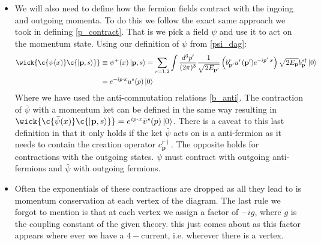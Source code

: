 \documentclass[11pt]{article}
\numberwithin{equation}{section}
\begin{document}
\begin{itemize}
   \item We will also need to define how the fermion fields contract with the ingoing and outgoing momenta. To do this we follow the exact same approach we took in defining \ref{p_contract}. That is we pick a field $\psi$ and use it to act on the momentum state. Using our definition of $\psi$ from \ref{psi_dag}:
   \begin{align}
   \label{p_contract_psi}
      \wick{\c{\psi(x)}\c{\ket{\textbf{p},s}}} &\equiv \psi^+(x)\ket{\textbf{p},s} = \sum_{r=1,2}\int \frac{d^3p'}{(2\pi)^3}\frac{1}{\sqrt{2E_{\textbf{p}'}}}\left(b^{r}_{\textbf{p}'}u^r(\textbf{p}')e^{-ip'\cdot x}\right) \sqrt{2E_{\textbf{p}}}b^{s \dagger}_{\textbf{p}}\ket{0} \nonumber \\
      & = e^{-ip\cdot x}u^{s}(p)\ket{0}
    \end{align} 
    Where we have used the anti-commutation relations \ref{b_anti}. The contraction of $\bar{\psi}$ with a momentum ket can be defined in the same way resulting in $\wick{\c{\bar{\psi}(x)}\c{\ket{\textbf{p},s}}} = e^{ip\cdot x}\bar{v}^{s}(p)\ket{0}$. There is a caveat to this last definition in that it only holds if the ket $\bar{\psi}$ acts on is a anti-fermion as it needs to contain the creation operator $c^{r \dagger}_{\textbf{p}}$. The opposite holds for contractions with the outgoing states. $\psi$ must contract with outgoing anti-fermions and $\bar{\psi}$ with outgoing fermions.

    \item Often the exponentials of these contractions are dropped as all they lead to is momentum conservation at each vertex of the diagram. The last rule we forgot to mention is that at each vertex we assign a factor of $-ig$, where $g$ is the coupling constant of the given theory. this just comes about as this factor appears where ever we have a $4-$current, i.e. wherever there is a vertex. 


\end{itemize}
\end{document}
